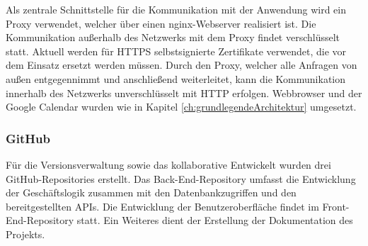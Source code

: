 Als zentrale Schnittstelle für die Kommunikation mit der Anwendung wird ein Proxy verwendet, welcher über einen nginx-Webserver realisiert ist.
Die Kommunikation außerhalb des Netzwerks mit dem Proxy findet verschlüsselt statt.
Aktuell werden für \acs{HTTPS} selbstsignierte Zertifikate verwendet, die vor dem Einsatz ersetzt werden müssen.
Durch den Proxy, welcher alle Anfragen von außen entgegennimmt und anschließend weiterleitet, kann die Kommunikation innerhalb des Netzwerks unverschlüsselt mit \acs{HTTP} erfolgen.
Webbrowser und der Google Calendar wurden wie in Kapitel \ref{ch:grundlegendeArchitektur} umgesetzt.

\subsubsection{GitHub}
Für die Versionsverwaltung sowie das kollaborative Entwickelt wurden drei GitHub-Repositories erstellt.
Das Back-End-Repository umfasst die Entwicklung der Geschäftslogik zusammen mit den Datenbankzugriffen und den bereitgestellten \ac{API}s.
Die Entwicklung der Benutzeroberfläche findet im Front-End-Repository statt.
Ein Weiteres dient der Erstellung der Dokumentation des Projekts.
